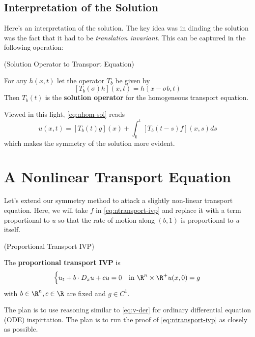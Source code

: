 \documentclass{bkcnotes}
\begin{document}
\subsection{Interpretation of the Solution}
Here's an interpretation of the solution. The key idea was in dinding
the solution was the fact that it had to be \emph{translation
  invariant}. This can be captured in the following operation:

\begin{ndefn}(Solution Operator to Transport Equation)

  For any $h(x,t)$ let the operator $T_b$ be given by
  \begin{equation}
    \label{eq:soln}
    [T_b(\sigma)h](x,t) = h(x-\sigma b,t)
  \end{equation}
  Then $T_b(t)$ is the \textbf{solution operator} for the homogeneous
  transport equation.
\end{ndefn}
Viewed in this light, \eqref{eq:nhom-sol} reads
\begin{equation}
  \label{eq:nhom-sol-op}
  u(x,t) = [T_b(t)g](x) + \int_0^t [T_b(t-s)f](x,s)ds
\end{equation}
which makes the symmetry of the solution more evident.

\section{A Nonlinear Transport Equation}
Let's extend our symmetry method to attack a slightly non-linear
transport equation. Here, we will take $f$ in
\eqref{eq:ntransport-ivp} and replace it with a term proportional to
$u$ so that the rate of motion along $(b,1)$ is proportional to $u$
itself.

\begin{ndefn}(Proportional Transport IVP)

  The \textbf{proportional transport IVP} is
  \begin{equation}
    \label{eq:ptransport-ivp}
    \begin{cases}
      u_t + b\cdot D_xu + cu = 0 & \text{in } \R^n \times \R^+
      u(x,0) = g
    \end{cases}
  \end{equation}
  with $b \in \R^n,c\in \R$ are fixed and $g \in C^1$.
\end{ndefn}
The plan is to use reasoning similar to \eqref{eq:v-der} for ordinary
differential equation (ODE) inspirtation. The plan is to run the proof
of \eqref{eq:ntransport-ivp} as closely as possible.
\end{document}
